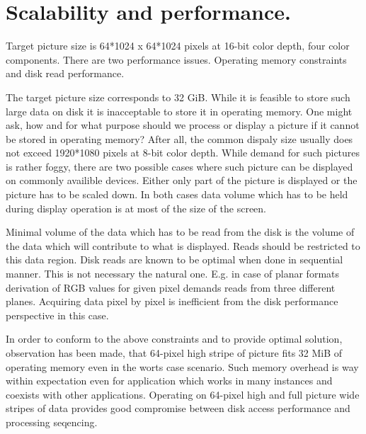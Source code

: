 \section{Scalability and performance.}

Target picture size is 64*1024 x 64*1024 pixels at 16-bit color depth, four color components. There are two performance issues. Operating memory constraints and disk read performance.

The target picture size corresponds to 32 GiB. While it is feasible to store such large data on disk it is inacceptable to store it in operating memory. One might ask, how and for what purpose should we process or display a picture if it cannot be stored in operating memory? After all, the common dispaly size usually does not exceed 1920*1080 pixels at 8-bit color depth. While demand for such pictures is rather foggy, there are two possible cases where such picture can be displayed on commonly availible devices. Either only part of the picture is displayed or the picture has to be scaled down. In both cases data volume which has to be held during display operation is at most of the size of the screen.

Minimal volume of the data which has to be read from the disk is the volume of the data which will  contribute to what is displayed. Reads should be restricted to this data region. Disk reads are known to be optimal when done in sequential manner. This is not necessary the natural one. E.g. in case of planar formats derivation of RGB values for given pixel demands reads from three different planes. Acquiring data pixel by pixel is inefficient from the disk performance perspective in this case.

In order to conform to the above constraints and to provide optimal solution, observation has been made, that 64-pixel high stripe of picture fits 32 MiB of operating memory even in the worts case scenario. Such memory overhead is way within expectation even for application which works in many instances and coexists with other applications. Operating on 64-pixel high and full picture wide stripes of data provides good compromise between disk access performance and processing seqencing.